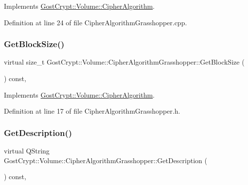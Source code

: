 Implements \hyperlink{class_gost_crypt_1_1_volume_1_1_cipher_algorithm_a6e7b19a0078b49c10536ad2f73b3b1ae}{Gost\+Crypt\+::\+Volume\+::\+Cipher\+Algorithm}.



Definition at line 24 of file Cipher\+Algorithm\+Grasshopper.\+cpp.

\mbox{\label{class_gost_crypt_1_1_volume_1_1_cipher_algorithm_grasshopper_a31f8600b20a03dbb9b0b6715b38cd570}} 
\subsubsection{\texorpdfstring{Get\+Block\+Size()}{GetBlockSize()}}
{\footnotesize\ttfamily virtual size\+\_\+t Gost\+Crypt\+::\+Volume\+::\+Cipher\+Algorithm\+Grasshopper\+::\+Get\+Block\+Size (\begin{DoxyParamCaption}{ }\end{DoxyParamCaption}) const\hspace{0.3cm}{\ttfamily [inline]}, {\ttfamily [virtual]}}



Implements \hyperlink{class_gost_crypt_1_1_volume_1_1_cipher_algorithm_acea94097c86d12a5e5c7bbee613526a2}{Gost\+Crypt\+::\+Volume\+::\+Cipher\+Algorithm}.



Definition at line 17 of file Cipher\+Algorithm\+Grasshopper.\+h.

\mbox{\label{class_gost_crypt_1_1_volume_1_1_cipher_algorithm_grasshopper_aa9f30f9dea6a68e76b8dbe6c961f2bbe}} 
\subsubsection{\texorpdfstring{Get\+Description()}{GetDescription()}}
{\footnotesize\ttfamily virtual Q\+String Gost\+Crypt\+::\+Volume\+::\+Cipher\+Algorithm\+Grasshopper\+::\+Get\+Description (\begin{DoxyParamCaption}{ }\end{DoxyParamCaption}) const\hspace{0.3cm}{\ttfamily [inline]}, {\ttfamily [virtual]}}




